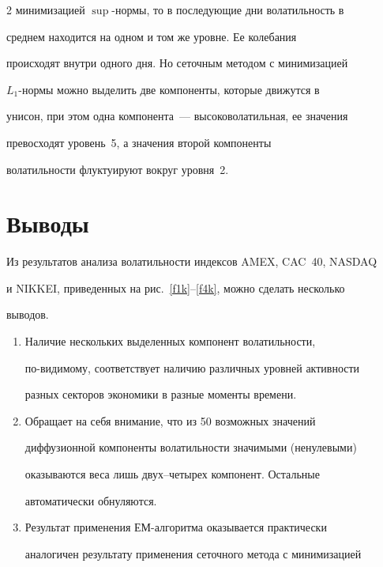 \begin{multicols}{2}
минимизацией $\sup$-нормы, то в последующие дни волатильность в


среднем находится на одном и том же уровне. Ее колебания


происходят внутри одного дня. Но сеточным методом с минимизацией


$L_1$-нормы можно выделить две компоненты, которые движутся в


унисон, при этом одна компонента~--- высоковолатильная, ее значения


превосходят уровень~5, а значения второй компоненты


волатильности флуктуируют вокруг уровня~2.








\section{Выводы}





Из результатов анализа волатильности индексов AMEX, CAC~40, NASDAQ


и NIKKEI, приведенных на рис.~\ref{f1k}--\ref{f4k}, можно сделать несколько


выводов.


\begin{enumerate}[1.]


\item Наличие нескольких выделенных компонент волатильности,


по-видимому, соответствует наличию различных уровней активности


разных секторов экономики в разные моменты времени.


\item


Обращает на себя внимание, что из 50 возможных значений


диффузионной компоненты волатильности значимыми (ненулевыми)


оказываются веса лишь двух--четырех компонент. Остальные


автоматически обнуляются.


\item


Результат применения ЕМ-алгоритма оказывается практически


аналогичен результату применения сеточного метода с минимизацией



\end{enumerate}
\end{multicols}
